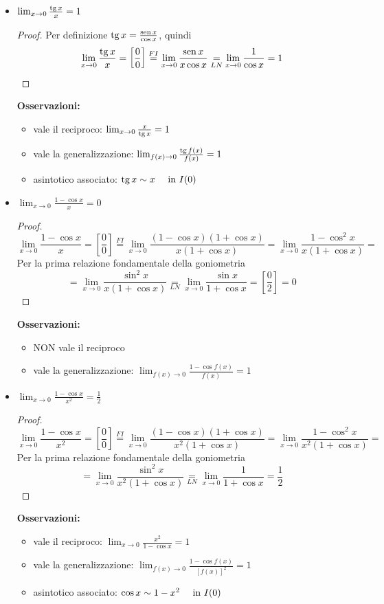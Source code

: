 \documentclass{book}     %
\begin{document}
\begin{itemize}
\begin{itemize}
\end{itemize}
\item {$\lim_{x\to 0}\frac{\operatorname{tg} x}{x}=1$}~
\\\begin{proof}
    Per definizione $\operatorname{tg} x=\frac{\operatorname{sen} x}{\cos x}$, quindi \[\lim_{x\to 0} \frac{\operatorname{tg} x}{x}=\left[\frac{0}{0}\right]\overset{FI}{=}\lim_{x\to 0} \frac{\operatorname{sen} x}{x \cos x}\underset{LN}{=}\lim_{x\to 0} \frac{1}{\cos x}=1\]
\end{proof}
\textbf{Osservazioni:}
\begin{itemize}
    \item vale il reciproco: $\lim_{x\to 0}\frac{x}{\operatorname{tg} x}=1$
    \item vale la generalizzazione: $\lim_{f(x)\to 0}\frac{\operatorname{tg} f(x)}{f(x)}=1$
    \item asintotico associato: $\operatorname{tg} x \sim x ~~~~\textnormal{in } I(0)$
\end{itemize}

\item {$\lim_{x\to 0}\frac{1-\cos x}{x}=0$}
\begin{proof}
\[\lim_{x\to 0} \frac{1-\cos x}{x}=\left[\frac{0}{0}\right]\overset{FI}{=}\lim_{x\to 0}\frac{(1-\cos x)(1+\cos x)}{x(1+\cos x)}=\lim_{x\to 0}\frac{1-\cos^2 x}{x(1+\cos x)}=\]Per la prima relazione fondamentale della goniometria\[=\lim_{x\to 0}\frac{\sin^2 x}{x(1+\cos x)}\underset{LN}{=}\lim_{x\to 0}\frac{\sin x}{1+\cos x}=\left[\frac{0}{2}\right]=0\]
\end{proof}
\textbf{Osservazioni:}
\begin{itemize}
    \item NON vale il reciproco
    \item vale la generalizzazione: $\lim_{f(x)\to 0}\frac{1-\cos f(x)}{f(x)}=1$
\end{itemize}

\item {$\lim_{x\to 0}\frac{1-\cos x}{x^2}=\frac{1}{2}$}
\begin{proof}
\[\lim_{x\to 0} \frac{1-\cos x}{x^2}=\left[\frac{0}{0}\right]\overset{FI}{=}\lim_{x\to 0}\frac{(1-\cos x)(1+\cos x)}{x^2(1+\cos x)}=\lim_{x\to 0}\frac{1-\cos^2 x}{x^2(1+\cos x)}=\]Per la prima relazione fondamentale della goniometria\[=\lim_{x\to 0}\frac{\sin^2 x}{x^2(1+\cos x)}\underset{LN}{=}\lim_{x\to 0}\frac{1}{1+\cos x}=\frac{1}{2}\]
\end{proof}
\textbf{Osservazioni:}
\begin{itemize}
    \item vale il reciproco: $\lim_{x\to 0}\frac{x^2}{1-\cos x}=1$
    \item vale la generalizzazione: $\lim_{f(x)\to 0}\frac{1- \cos f(x)}{[f(x)]^2}=1$
    \item asintotico associato: $\cos x \sim 1 - x^2 ~~~~\textnormal{in } I(0)$
\end{itemize}


\end{itemize}
\end{document}
